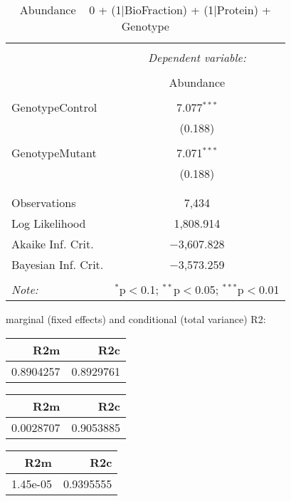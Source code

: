 \documentclass[11pt]{report}
\begin{document}
\begin{table}[!htbp] \centering 
  \caption{Abundance ~ 0 + (1|BioFraction) + (1|Protein) + Genotype} 
  \label{} 
\begin{tabular}{@{\extracolsep{5pt}}lc} 
\\[-1.8ex]\hline 
\hline \\[-1.8ex] 
 & \multicolumn{1}{c}{\textit{Dependent variable:}} \\ 
\cline{2-2} 
\\[-1.8ex] & Abundance \\ 
\hline \\[-1.8ex] 
 GenotypeControl & 7.077$^{***}$ \\ 
  & (0.188) \\ 
  & \\ 
 GenotypeMutant & 7.071$^{***}$ \\ 
  & (0.188) \\ 
  & \\ 
\hline \\[-1.8ex] 
Observations & 7,434 \\ 
Log Likelihood & 1,808.914 \\ 
Akaike Inf. Crit. & $-$3,607.828 \\ 
Bayesian Inf. Crit. & $-$3,573.259 \\ 
\hline 
\hline \\[-1.8ex] 
\textit{Note:}  & \multicolumn{1}{r}{$^{*}$p$<$0.1; $^{**}$p$<$0.05; $^{***}$p$<$0.01} \\ 
\end{tabular} 
\end{table} 
marginal (fixed effects) and conditional (total variance) R2:

\begin{tabular}{r|r}
\hline
R2m & R2c\\
\hline
0.8904257 & 0.8929761\\
\hline
\end{tabular}

\begin{tabular}{r|r}
\hline
R2m & R2c\\
\hline
0.0028707 & 0.9053885\\
\hline
\end{tabular}

\begin{tabular}{r|r}
\hline
R2m & R2c\\
\hline
1.45e-05 & 0.9395555\\
\hline
\end{tabular}
\end{document}
